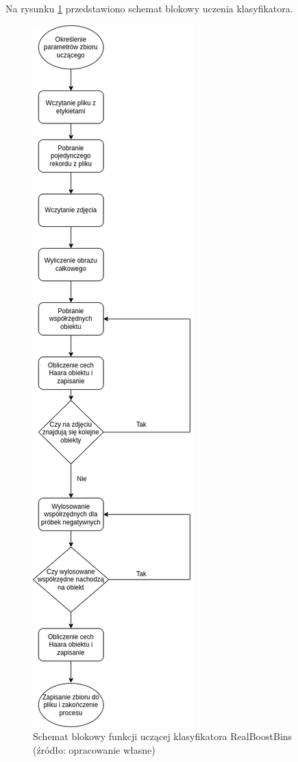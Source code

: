 Na rysunku \ref{fig:fit_realboostbins} przedstawiono schemat blokowy uczenia klasyfikatora.
\begin{figure}[!ht]
    \centering
    \includegraphics[scale=0.4]{Pictures/prepare_haar_dataset}
    \caption{Schemat blokowy funkcji uczącej klasyfikatora RealBoostBins (źródło: opracowanie własne)}
    \label{fig:fit_realboostbins}
\end{figure}
\FloatBarrier


